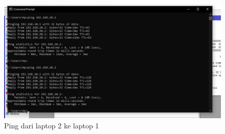 \begin{figure}[H]
	\centering
	\includegraphics[scale=0.55]{P1/img/ping 20.2.jpg}
	\caption{Ping dari laptop 2 ke laptop 1}
\end{figure}

